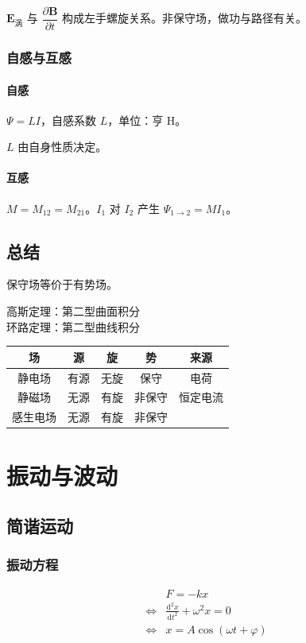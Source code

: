 \documentclass[12pt, a4paper, UTF8, openany]{ctexbook}
\newcommand{\dif}{\mathrm{d}}
\newcommand{\vect}[1]{\mathbf{#1}}
\newcommand{\vece}{\vect{E}}
\newcommand{\vecb}{\vect{B}}
\begin{document}
        $\vece_{\text{涡}}$ 与 $\dfrac{\partial \vecb}{\partial t}$ 构成左手螺旋关系。{\heiti 非保守场}，做功与路径有关。

        \subsection{自感与互感}
        \subsubsection{自感}
        $\Psi = LI$，自感系数 $L$，单位：亨 $\text{H}$。

        $L$ 由自身性质决定。

        \subsubsection{互感}
        $M = M_{12} = M_{21}$。$I_1$ 对 $I_2$ 产生 $\Psi_{1 \to 2} = M I_1$。

    \section{总结}
    保守场等价于有势场。

    高斯定理：第二型曲面积分 \\
    环路定理：第二型曲线积分

    \begin{longtable}[h]{c | c c c | c}
        场 & 源 & 旋 & 势 & 来源 \\
        \toprule

        静电场 & 有源 & 无旋 & 保守 & 电荷 \\
        \addlinespace
        静磁场 & 无源 & 有旋 & 非保守 & 恒定电流 \\
        \addlinespace
        感生电场 & 无源 & 有旋 & 非保守 & \\
    \end{longtable}

    \chapter{振动与波动}
    \section{简谐运动}
        \subsection{振动方程}
        $$\begin{aligned}
            & F = -kx \\
            \iff & \frac{\dif^2 x}{\dif t^2} + \omega^2 x = 0 \\
            \iff & x = A \cos (\omega t + \varphi)
        \end{aligned}$$
\end{document}
